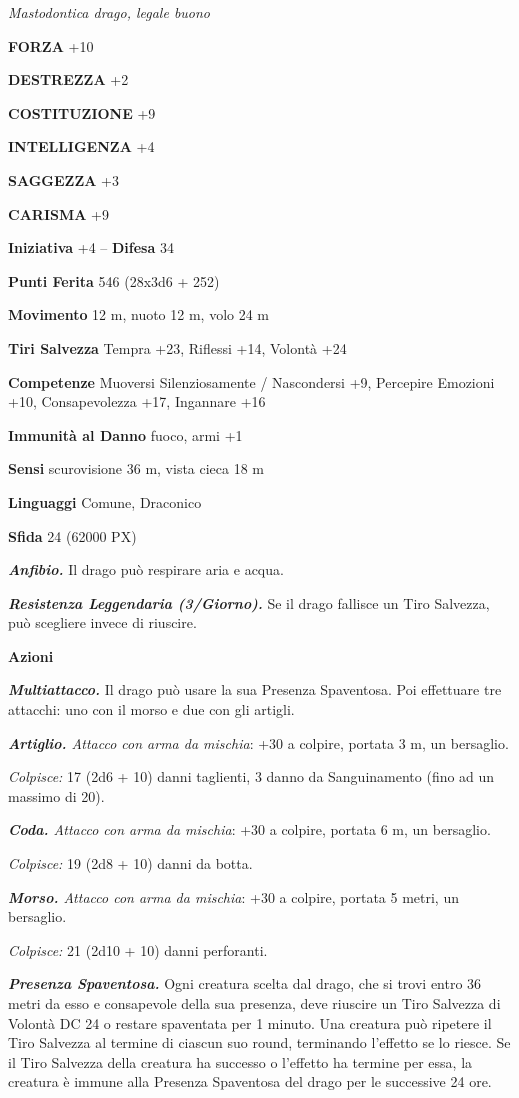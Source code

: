 \begin{multicols}{2}
	\textit{Mastodontica drago, legale buono}

	\textbf{FORZA} +10

	\textbf{DESTREZZA} +2

	\textbf{COSTITUZIONE} +9

	\textbf{INTELLIGENZA} +4

	\textbf{SAGGEZZA} +3

	\textbf{CARISMA} +9

	\textbf{Iniziativa} +4 -- \textbf{Difesa} 34

	\textbf{Punti Ferita} 546 (28x3d6 + 252)

	\textbf{Movimento} 12 m, nuoto 12 m, volo 24 m

	\textbf{Tiri Salvezza} Tempra +23, Riflessi +14, Volontà +24

	\textbf{Competenze} Muoversi Silenziosamente / Nascondersi +9, Percepire Emozioni +10, Consapevolezza +17, Ingannare +16

	\textbf{Immunità al Danno} fuoco, armi +1

	\textbf{Sensi} scurovisione 36 m, vista cieca 18 m

	\textbf{Linguaggi} Comune, Draconico

	\textbf{Sfida} 24 (62000 PX)

	\textit{\textbf{Anfibio.}} Il drago può respirare aria e acqua.

	\textit{\textbf{Resistenza Leggendaria (3/Giorno).}} Se il drago fallisce un Tiro Salvezza, può scegliere invece di riuscire.

	\textbf{Azioni}

	\textit{\textbf{Multiattacco.}} Il drago può usare la sua Presenza Spaventosa. Poi effettuare tre attacchi: uno con il morso e due con gli artigli.

	\textit{\textbf{Artiglio.} Attacco con arma da mischia}: +30 a colpire, portata 3 m, un bersaglio.

	\textit{Colpisce:} 17 (2d6 + 10) danni taglienti, 3 danno da Sanguinamento (fino ad un massimo di 20).

	\textit{\textbf{Coda.} Attacco con arma da mischia}: +30 a colpire, portata 6 m, un bersaglio.

	\textit{Colpisce:} 19 (2d8 + 10) danni da botta.

	\textit{\textbf{Morso.} Attacco con arma da mischia}: +30 a colpire, portata 5 metri, un bersaglio.

	\textit{Colpisce:} 21 (2d10 + 10) danni perforanti.

	\textit{\textbf{Presenza Spaventosa.}} Ogni creatura scelta dal drago, che si trovi entro 36 metri da esso e consapevole della sua presenza, deve riuscire un Tiro Salvezza di Volontà DC 24 o restare spaventata per 1 minuto. Una creatura può ripetere il Tiro Salvezza al termine di ciascun suo round, terminando l'effetto se lo riesce. Se il Tiro Salvezza della creatura ha successo o l'effetto ha termine per essa, la creatura è immune alla Presenza Spaventosa del drago per le successive 24 ore.


\end{multicols}
